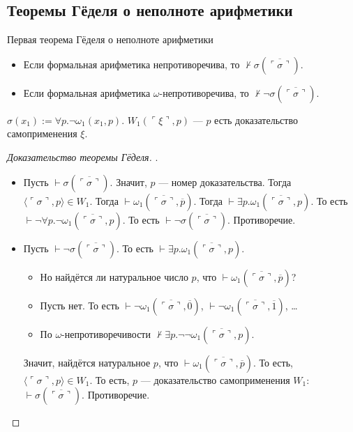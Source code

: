 \subsection{Теоремы Гёделя о неполноте арифметики}


\begin{theorem}Первая теорема Гёделя о неполноте арифметики
    \begin{itemize}
    \item Если формальная арифметика непротиворечива, то $\not\vdash\sigma(\overline{\ulcorner\sigma\urcorner})$.
    \item Если формальная арифметика $\omega$-непротиворечива, то $\not\vdash\neg\sigma(\overline{\ulcorner\sigma\urcorner})$.
    \end{itemize}
\end{theorem}


\begin{note}
    $\sigma(x_1) := \forall p.\neg\omega_1(x_1,p)$. $W_1(\ulcorner\xi\urcorner,p)$ --- $p$ есть доказательство самоприменения $\xi$.
\end{note}

\begin{proof}[Доказательство теоремы Гёделя].
\begin{itemize}
\item Пусть $\vdash\sigma(\overline{\ulcorner\sigma\urcorner})$. Значит, $p$ --- номер доказательства.  Тогда
$\langle\ulcorner\sigma\urcorner,p\rangle \in W_1$.  Тогда $\vdash\omega_1(\overline{\ulcorner\sigma\urcorner},\overline{p})$.
Тогда $\vdash\exists p.\omega_1(\overline{\ulcorner\sigma\urcorner},p)$.  То есть
$\vdash\neg\forall p.\neg\omega_1(\overline{\ulcorner\sigma\urcorner},p)$.  То есть $\vdash\neg\sigma(\overline{\ulcorner\sigma\urcorner})$. Противоречие.

\item Пусть $\vdash\neg\sigma(\overline{\ulcorner\sigma\urcorner})$.  То есть $\vdash\exists p.\omega_1(\overline{\ulcorner\sigma\urcorner},p)$.
\begin{itemize}
\item
 Но найдётся ли натуральное число $p$, что $\vdash\omega_1(\overline{\ulcorner\sigma\urcorner},\overline{p})$?

\item Пусть нет. То есть $\vdash\neg\omega_1(\overline{\ulcorner\sigma\urcorner},\overline{0})$, $\vdash\neg\omega_1(\overline{\ulcorner\sigma\urcorner},\overline{1})$, \dots

\item По $\omega$-непротиворечивости $\not\vdash\exists p.\neg\neg\omega_1(\overline{\ulcorner\sigma\urcorner},p)$.
\end{itemize}
       Значит, найдётся натуральное $p$, что $\vdash\omega_1(\overline{\ulcorner\sigma\urcorner},\overline{p})$.
То есть, $\langle\ulcorner\sigma\urcorner, p\rangle\in W_1$.
То есть, $p$ --- доказательство самоприменения $W_1$: $\vdash\sigma(\overline{\ulcorner\sigma\urcorner})$.  Противоречие.
\end{itemize}
\end{proof}


